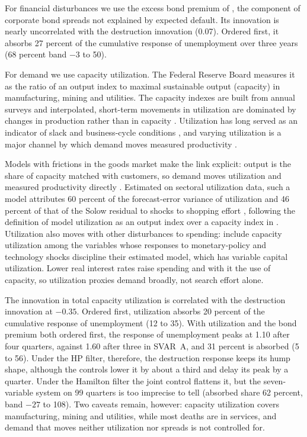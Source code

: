 \documentclass[authoryear, review, 12pt]{elsarticle}
\begin{document}
For financial disturbances we use the excess bond premium of \citet{gilchrist_2012}, the component of corporate bond spreads not explained by expected default. Its innovation is nearly uncorrelated with the destruction innovation (0.07). Ordered first, it absorbs 27 percent of the cumulative response of unemployment over three years (68 percent band $-3$ to 50).

For demand we use capacity utilization. The Federal Reserve Board measures it as the ratio of an output index to maximal sustainable output (capacity) in manufacturing, mining and utilities. The capacity indexes are built from annual surveys and interpolated, short-term movements in utilization are dominated by changes in production rather than in capacity \citep{corrado_1997}. Utilization has long served as an indicator of slack and business-cycle conditions \citep{corrado_1997}, and varying utilization is a major channel by which demand moves measured productivity \citep{bai_2025}. 

Models with frictions in the goods market make the link explicit: output is the share of capacity matched with customers, so demand moves utilization and measured productivity directly \citep{michaillat_2015, huo_2020, bai_2025}. Estimated on sectoral utilization data, such a model attributes 60 percent of the forecast-error variance of utilization and 46 percent of that of the Solow residual to shocks to shopping effort \citep[Table 4]{silva_urias_2025}, following the definition of model utilization as an output index over a capacity index in \citet{qiu_2022}. Utilization also moves with other disturbances to spending: \citet{christiano_2016} include capacity utilization among the variables whose responses to monetary-policy and technology shocks discipline their estimated model, which has variable capital utilization. Lower real interest rates raise spending and with it the use of capacity, so utilization proxies demand broadly, not search effort alone.

The innovation in total capacity utilization is correlated with the destruction innovation at $-0.35$. Ordered first, utilization absorbs 20 percent of the cumulative response of unemployment (12 to 35). With utilization and the bond premium both ordered first, the response of unemployment peaks at 1.10 after four quarters, against 1.60 after three in SVAR~A, and 31 percent is absorbed (5 to 56).
Under the HP filter, therefore, the destruction response keeps its hump shape, although the controls lower it by about a third and delay its peak by a quarter. Under the Hamilton filter the joint control flattens it, but the seven-variable system on 99 quarters is too imprecise to tell (absorbed share 62 percent, band $-27$ to 108).
Two caveats remain, however: capacity utilization covers manufacturing, mining and utilities, while most deaths are in services, and demand that moves neither utilization nor spreads is not controlled for.
\end{document}
